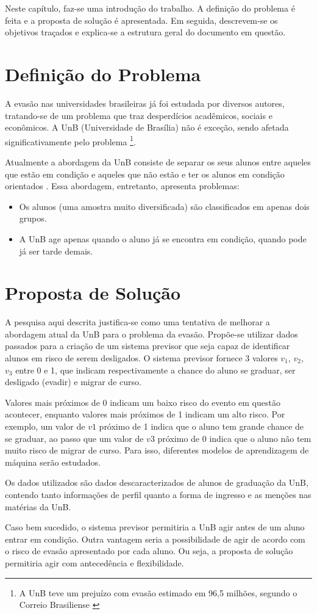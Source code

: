 Neste capítulo, faz-se uma introdução do trabalho. A definição do problema é feita e
a proposta de solução é apresentada. Em seguida, descrevem-se os objetivos traçados e
explica-se a estrutura geral do documento em questão. 

\section{Definição do Problema}
A evasão nas universidades brasileiras já foi estudada por diversos autores,
tratando-se de um problema que traz desperdícios acadêmicos, sociais e econômicos.
A UnB (Universidade de Brasília) não é exceção, sendo afetada significativamente pelo
problema \footnote{A UnB teve um prejuízo com evasão estimado em 96,5 milhões,
segundo o Correio Brasiliense \cite{correio}}.

\par Atualmente a abordagem da UnB consiste de separar os seus alunos entre aqueles
que estão em condição e aqueles que não estão e ter os alunos em condição orientados
\cite{manual_calouro}. Essa abordagem, entretanto, apresenta problemas:
\begin{itemize}
    \item Os alunos (uma amostra muito diversificada) são classificados em apenas
dois grupos.
    \item A UnB age apenas quando o aluno já se encontra em condição, quando pode
já ser tarde demais.
\end{itemize}

\section{Proposta de Solução}
A pesquisa aqui descrita justifica-se como uma tentativa de melhorar a abordagem
atual da UnB para o problema da evasão. Propõe-se utilizar dados passados para
a criação de um sistema previsor que seja capaz de identificar alunos em risco de
serem desligados. O sistema previsor fornece 3 valores $v_1$, $v_2$, $v_3$ entre 0
e 1, que indicam respectivamente a chance do aluno se graduar, ser desligado (evadir)
e migrar de curso. 
\par Valores mais próximos de 0 indicam um baixo risco do evento em
questão acontecer, enquanto valores mais próximos de 1 indicam um alto risco. Por
exemplo, um valor de $v1$ próximo de 1 indica que o aluno tem grande chance de se
graduar, ao passo que um valor de $v3$ próximo de 0 indica que o aluno não tem 
muito risco de migrar de curso. Para isso, diferentes modelos de aprendizagem de
máquina serão estudados. 
\par Os dados utilizados são dados descaracterizados de alunos de
graduação da UnB, contendo tanto informações de perfil quanto a forma de ingresso e
as menções nas matérias da UnB. 
\par Caso bem sucedido, o sistema previsor permitiria a
UnB agir antes de um aluno entrar em condição. Outra vantagem seria a possibilidade
de agir de acordo com o risco de evasão apresentado por cada
aluno. Ou seja, a proposta de solução permitiria agir com antecedência e
flexibilidade. 

